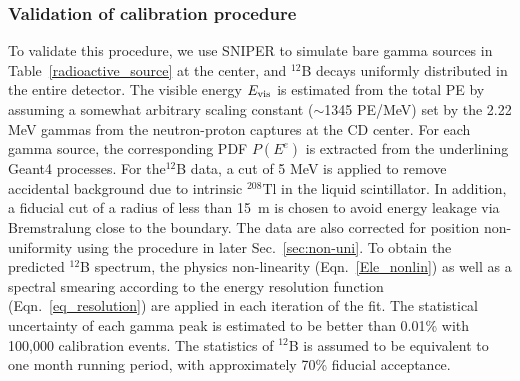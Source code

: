 \documentclass[a4paper,10pt,twoside]{cpc-hepnp}
\begin{document}
\begin{CJK*}{GB}{gbsn}
\begin{multicols}{2}
\subsubsection{Validation of calibration procedure}
To validate this procedure, we use SNIPER to simulate bare gamma
sources in Table~\ref{radioactive_source} at the center, and $^{12}$B
decays uniformly distributed in the entire detector. 
The visible energy $E_{\rm vis}$ is estimated from the total PE by assuming a
somewhat arbitrary scaling constant ($\sim$1345 PE/MeV) set by the 2.22
MeV gammas from the neutron-proton captures at the CD center.  For
each gamma source, the corresponding PDF $P(E^e)$ is extracted from
the underlining Geant4 processes. For the$^{12}$B data, a cut of 5 MeV
is applied to remove accidental background due to intrinsic $^{208}$Tl
in the liquid scintillator. In addition, a fiducial cut of a radius of
less than 15~m is chosen to avoid energy leakage via Bremstralung
close to the boundary. The data are also corrected for position
non-uniformity using the procedure in later {Sec.~\ref{sec:non-uni}}. To
obtain the predicted $^{12}$B spectrum, the physics non-linearity
(Eqn.~\ref{Ele_nonlin}) as well as a spectral smearing according to
the energy resolution function (Eqn.~\ref{eq_resolution}) are applied
in each iteration of the fit.  The statistical uncertainty of each
gamma peak is estimated to be better than 0.01\% with 100,000
calibration events. The statistics of $^{12}$B is assumed to be
equivalent to one month running period, with approximately 70\%
fiducial acceptance.


\end{multicols}
\end{CJK*}
\end{document}
